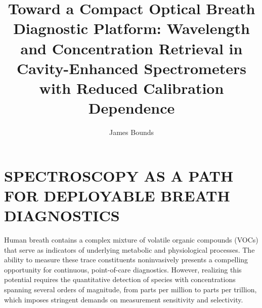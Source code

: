 \documentclass[8pt,a4paper]{report}
\begin{document}
	\title{Toward a Compact Optical Breath Diagnostic Platform: Wavelength and Concentration Retrieval in Cavity-Enhanced Spectrometers with Reduced Calibration Dependence}
	\author{James Bounds}
	\maketitle
	
	

	
%	
%	
%	
%	
%	
%	
	
	
	
	
	
	
	\tableofcontents
	
	\setcounter{page}{1}
	
	
	\chapter{SPECTROSCOPY AS A PATH FOR DEPLOYABLE BREATH DIAGNOSTICS}
	
	Human breath contains a complex mixture of volatile organic compounds (VOCs) that serve as indicators of underlying metabolic and physiological processes. The ability to measure these trace constituents noninvasively presents a compelling opportunity for continuous, point-of-care diagnostics. However, realizing this potential requires the quantitative detection of species with concentrations spanning several orders of magnitude, from parts per million to parts per trillion, which imposes stringent demands on measurement sensitivity and selectivity.
	
\end{document}
